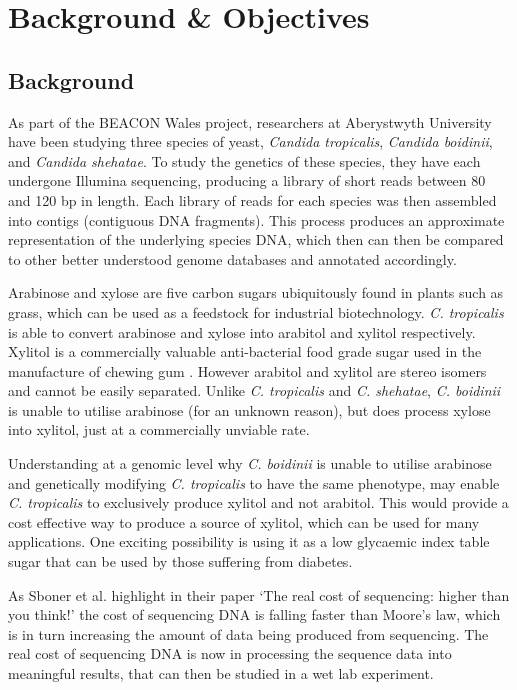 \chapter{Background \& Objectives}

\section{Background}
As part of the BEACON Wales\cite{beacon} project, researchers at Aberystwyth University have been studying three species of yeast, \textit{Candida tropicalis}, \textit{Candida boidinii}, and \textit{Candida shehatae}. To study the genetics of these species, they have each undergone Illumina sequencing, producing a library of short reads between 80 and 120 bp in length. Each library of reads for each species was then assembled into contigs (contiguous DNA fragments). This process produces an approximate representation of the underlying species DNA, which then can then be compared to other better understood genome databases and annotated accordingly.

Arabinose and xylose are five carbon sugars ubiquitously found in plants such as grass, which can be used as a feedstock for industrial biotechnology. \textit{C. tropicalis} is able to convert arabinose and xylose into arabitol and xylitol respectively. Xylitol is a commercially valuable anti-bacterial food grade sugar used in the manufacture of chewing gum \cite{xylitol}. However arabitol and xylitol are stereo isomers and cannot be easily separated. Unlike \textit{C. tropicalis} and \textit{C. shehatae},  \textit{C. boidinii} is unable to utilise arabinose (for an unknown reason), but does process xylose into xylitol, just at a commercially unviable rate. 

Understanding at a genomic level why \textit{C. boidinii} is unable to utilise arabinose and genetically modifying \textit{C. tropicalis} to have the same phenotype, may enable \textit{C. tropicalis} to exclusively produce xylitol and not arabitol. This would provide a cost effective way to produce a source of xylitol, which can be used for many applications. One exciting possibility is using it as a low glycaemic index table sugar that can be used by those suffering from diabetes.

As Sboner et al. highlight in their paper `The real cost of sequencing: higher than you think!'\cite{sequencingcost} the cost of sequencing DNA is falling faster than Moore's law, which is in turn increasing the amount of data being produced from sequencing. The real cost of sequencing DNA is now in processing the sequence data into meaningful results, that can then be studied in a wet lab experiment. 

